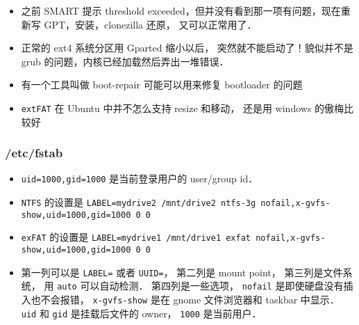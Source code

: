 \begin{itemize}
\item 之前 SMART 提示 threshold exceeded，但并没有看到那一项有问题，现在重新写 GPT，安装，clonezilla 还原， 又可以正常用了．
\item  正常的 ext4 系统分区用 Gparted 缩小以后， 突然就不能启动了！貌似并不是 grub 的问题，内核已经加载然后弄出一堆错误．
\item 有一个工具叫做 boot-repair 可能可以用来修复 bootloader 的问题
\item \verb|extFAT| 在 Ubuntu 中并不怎么支持 resize 和移动， 还是用 windows 的傲梅比较好
\end{itemize}

\subsubsection{/etc/fstab}
\begin{itemize}
\item \verb|uid=1000,gid=1000| 是当前登录用户的 user/group id．
\item \verb|NTFS| 的设置是 \verb|LABEL=mydrive2 /mnt/drive2 ntfs-3g nofail,x-gvfs-show,uid=1000,gid=1000 0 0|
\item \verb|exFAT| 的设置是 \verb|LABEL=mydrive1 /mnt/drive1 exfat nofail,x-gvfs-show,uid=1000,gid=1000 0 0|
\item 第一列可以是 \verb|LABEL=| 或者 \verb|UUID=|， 第二列是 mount point， 第三列是文件系统， 用 \verb|auto| 可以自动检测． 第四列是一些选项， \verb|nofail| 是即使硬盘没有插入也不会报错， \verb|x-gvfs-show| 是在 gnome 文件浏览器和 taskbar 中显示． \verb|uid| 和 \verb|gid| 是挂载后文件的 owner， \verb|1000| 是当前用户．
\end{itemize}


